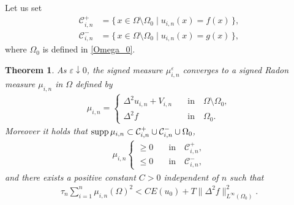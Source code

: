 \documentclass[12pt]{amsart}
\newtheorem{thm}{Theorem}[section]
\begin{document}
Let us set  
\begin{align}
{\mathcal{C}}^{+}_{i,n} &= \{\, x \in \Omega \setminus \Omega_0 \mid u_{i,n}(x)= f(x) \,\}, \\
{\mathcal{C}}^{-}_{i,n} &= \{\, x \in \Omega \setminus \Omega_0 \mid u_{i,n}(x)= g(x) \,\},  
\end{align}
where $\Omega_0$ is defined in \eqref{Omega_0}. 
\begin{thm} \label{Radon-2}
As ${\varepsilon} \downarrow 0$, the signed measure $\mu^{\varepsilon}_{i,n}$ converges to a signed Radon measure $\mu_{i,n}$ in $\Omega$ 
defined by 
\begin{align*}
\mu_{i,n} = 
\begin{cases}
\Delta^2 u_{i,n} + V_{i,n} \quad & \text{in} \quad \Omega \setminus \Omega_0, \\
\Delta^2 f \quad & \text{in} \quad \Omega_0. 
\end{cases}
\end{align*} 
Moreover it holds that  
${\rm supp}\, \mu_{i,n} \subset {\mathcal{C}}^{+}_{i,n} \cup {\mathcal{C}}^{-}_{i,n} \cup \Omega_0$,  
\begin{align*}
\mu_{i,n} 
\begin{cases}
\ge 0 \quad & \text{in} \quad {\mathcal{C}}^{+}_{i,n}, \\
\le 0 \quad & \text{in} \quad {\mathcal{C}}^{-}_{i,n},  
\end{cases}
\end{align*}
and there exists a positive constant $C>0$ independent of $n$ such that 
\begin{align} \label{bdd-meas-2}
\tau_n \sum^{n}_{i=1} \mu_{i,n}(\Omega)^2 < C E(u_0) + T \| \Delta^2 f \|^2_{L^{\infty}(\Omega_0)}. 
\end{align}
\end{thm}
\end{document}
